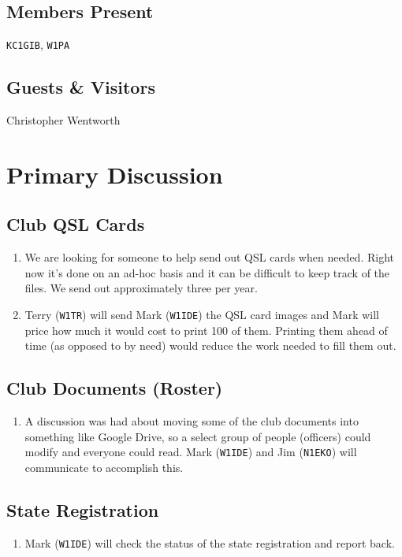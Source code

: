 \documentclass[10pt,letterpaper]{article}
\begin{document}
\subsection{Members Present}
\texttt{KC1GIB}, \texttt{W1PA}

\subsection{Guests \& Visitors}
Christopher Wentworth

\section{Primary Discussion}

\subsection{Club QSL Cards}
\begin{enumerate}
  \item We are looking for someone to help send out QSL cards when needed. Right now it's done on an ad-hoc basis and it can be difficult to keep track of the files. We send out approximately three per year.
  \item Terry (\texttt{W1TR}) will send Mark (\texttt{W1IDE}) the QSL card images and Mark will price how much it would cost to print 100 of them. Printing them ahead of time (as opposed to by need) would reduce the work needed to fill them out.
\end{enumerate}

\subsection{Club Documents (Roster)}
\begin{enumerate}
  \item A discussion was had about moving some of the club documents into something like Google Drive, so a select group of people (officers) could modify and everyone could read. Mark (\texttt{W1IDE}) and Jim (\texttt{N1EKO}) will communicate to accomplish this.
\end{enumerate}

\subsection{State Registration}
\begin{enumerate}
  \item Mark (\texttt{W1IDE}) will check the status of the state registration and report back.
\end{enumerate}
\end{document}

